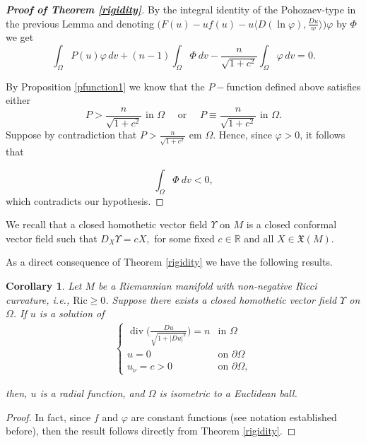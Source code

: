 \documentclass[12pt]{amsart}
\theoremstyle{plain}
\newtheorem{corollary}{\bf Corollary}
\numberwithin{equation}{section}
\begin{document}
\begin{proof}[\textbf{Proof of Theorem \ref{rigidity}}]
    By the integral identity of the Pohozaev-type in the previous Lemma and denoting $\Big(F(u) - uf(u) - u\Big\langle D(\ln\varphi), \frac{Du}{w}\Big\rangle\Big)\varphi$ by $\Phi$ we get 
  \[
\int_\Omega P(u)\varphi\, dv +(n-1)\int_\Omega\Phi~dv -\frac{n}{\sqrt{1+c^2}}\int_\Omega\varphi\, dv= 0.
\]

   By Proposition \ref{pfunction1} we know that the $P-$function defined above  satisfies either $$P>\frac{n}{\sqrt{1+c^2}}\text{ in }\Omega\,\,\,\,\,\, \text{ or }\,\,\,\,\,\,P\equiv\frac{n}{\sqrt{1+c^2}}\text{ in }\Omega.$$ Suppose by contradiction that $P>\displaystyle\frac{n}{\sqrt{1+c^2}}\text{ em }\Omega$. Hence, since $\varphi>0$, it follows that 
    

\[
\int_\Omega \Phi~dv< 0,
\]
which contradicts our hypothesis.
    
\end{proof}

We recall that a closed homothetic vector field $\Upsilon$ on $M$ is a closed conformal vector field such that $D_X\Upsilon=cX,$ for some fixed $c\in\mathbb R$ and all $X\in \mathfrak{X}(M).$

As a direct consequence of Theorem \ref{rigidity} we have the following results.

\begin{corollary}
    Let \( M \) be a Riemannian manifold with non-negative Ricci curvature, i.e., \( \mathrm{Ric} \geq 0 \). Suppose there exists a closed homothetic vector field \(\Upsilon\) on \( \Omega \).
    If \( u \) is a solution of 
\begin{align*} \label{cmc}
\left\{
\begin{array}{lll}
 \operatorname{div}\Big(\frac{D u}{\sqrt{1+|D u|^2}}\Big)=n & \text{in } \Omega \\
u= 0& \text{on } \partial\Omega \\
u_{\nu}=c>0& \text{on } \partial\Omega, 
\end{array}
\right.  
\end{align*}

then, $u$ is a radial function, and \( \Omega \) is isometric to a Euclidean ball.
\end{corollary}

\begin{proof}
In fact, since $f$ and $\varphi$ are constant functions (see notation established before), then the result follows directly from Theorem \ref{rigidity}.
\end{proof}
\end{document}
